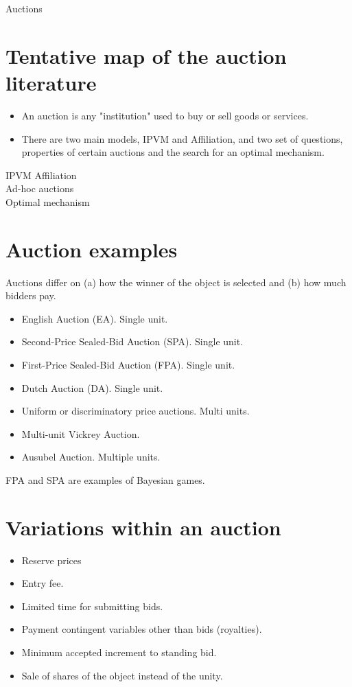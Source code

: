 \documentclass[10pt]{article}
\begin{document}
Auctions

\section*{Tentative map of the auction literature}
\begin{itemize}
  \item An auction is any "institution" used to buy or sell goods or services.
  \item There are two main models, IPVM and Affiliation, and two set of questions, properties of certain auctions and the search for an optimal mechanism.
\end{itemize}

IPVM Affiliation\\
Ad-hoc auctions\\
Optimal mechanism

\section*{Auction examples}
Auctions differ on (a) how the winner of the object is selected and (b) how much bidders pay.

\begin{itemize}
  \item English Auction (EA). Single unit.
  \item Second-Price Sealed-Bid Auction (SPA). Single unit.
  \item First-Price Sealed-Bid Auction (FPA). Single unit.
  \item Dutch Auction (DA). Single unit.
  \item Uniform or discriminatory price auctions. Multi units.
  \item Multi-unit Vickrey Auction.
  \item Ausubel Auction. Multiple units.
\end{itemize}

FPA and SPA are examples of Bayesian games.

\section*{Variations within an auction}
\begin{itemize}
  \item Reserve prices
  \item Entry fee.
  \item Limited time for submitting bids.
  \item Payment contingent variables other than bids (royalties).
  \item Minimum accepted increment to standing bid.
  \item Sale of shares of the object instead of the unity.
\end{itemize}
\end{document}
